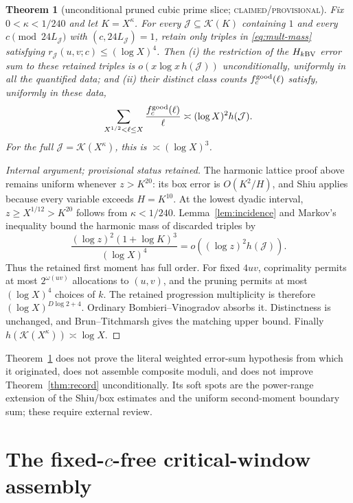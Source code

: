\documentclass[10pt,reqno]{amsart}
\newtheorem{theorem}{Theorem}[section]
\theoremstyle{definition}
\newcommand{\1}{\mathbf 1}
\begin{document}
\begin{theorem}[unconditional pruned cubic prime slice; \textsc{claimed/provisional}]\label{thm:pruned}
Fix $0<\kappa<1/240$ and let $K=X^\kappa$.  For every
$\mathcal J\subseteq\mathcal K(K)$ containing $1$ and every
$c\pmod{24L_\mathcal J}$ with $(c,24L_\mathcal J)=1$, retain only triples in \eqref{eq:mult-mass} satisfying
$r_\mathcal J(u,v;c)\leq(\log X)^4$.  Then (i) the restriction of the
$H_{k\rm BV}$ error sum to these retained triples is
$o(x\log x\,h(\mathcal J))$ unconditionally, uniformly in all the
quantified data; and (ii) their distinct class counts
$f_c^{\rm good}(\ell)$ satisfy, uniformly in these data,
\[
 \sum_{X^{1/2}<\ell\leq X}\frac{f_c^{\rm good}(\ell)}\ell
 \asymp(\log X)^2h(\mathcal J).
\]
For the full $\mathcal J=\mathcal K(X^\kappa)$, this is $\asymp(\log X)^3$.
\end{theorem}
\begin{proof}[Internal argument; provisional status retained]
The harmonic lattice proof above remains uniform whenever $z>K^{20}$: its box error is $O(K^2/H)$, and Shiu applies because every variable exceeds $H=K^{10}$.  At the lowest dyadic interval, $z\geq X^{1/12}>K^{20}$ follows from $\kappa<1/240$.  Lemma~\ref{lem:incidence} and Markov's inequality bound the harmonic mass of discarded triples by
\[
 \frac{(\log z)^2(1+\log K)^3}{(\log X)^4}
 =o((\log z)^2h(\mathcal J)).
\]
Thus the retained first moment has full order.  For fixed $4uv$, coprimality permits at most $2^{\omega(uv)}$ allocations to $(u,v)$, and the pruning permits at most $(\log X)^4$ choices of $k$.  The retained progression multiplicity is therefore
$(\log X)^{D\log2+4}$.  Ordinary Bombieri--Vinogradov absorbs it.  Distinctness is unchanged, and Brun--Titchmarsh gives the matching upper bound.  Finally
$h(\mathcal K(X^\kappa))\asymp\log X$.
\end{proof}
Theorem~\ref{thm:pruned} does not prove the literal weighted error-sum hypothesis from which it originated, does not assemble composite moduli, and does not improve Theorem~\ref{thm:record} unconditionally.  Its soft spots are the power-range extension of the Shiu/box estimates and the uniform second-moment boundary sum; these require external review.

\section{The fixed-$c$-free critical-window assembly}\label{sec:cfree}
\begin{center}
\end{center}
\end{document}
